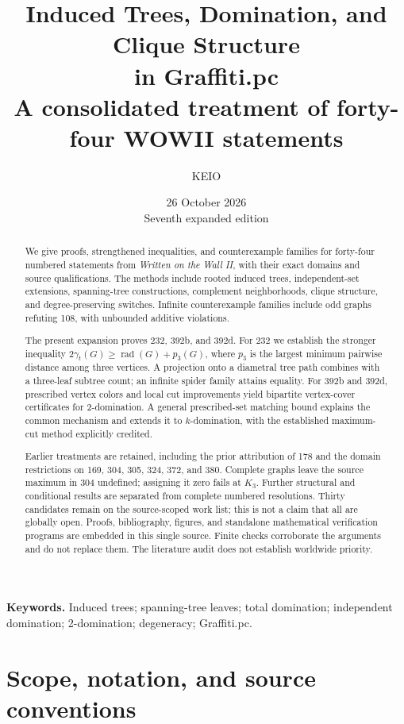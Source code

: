 \documentclass[11pt,a4paper]{article}
\title{\bfseries Induced Trees, Domination, and Clique Structure\protect\\
in Graffiti.pc\protect\\[6pt]
\large A consolidated treatment of forty-four WOWII statements}
\author{KEIO}
\date{26 October 2026\protect\\[3pt]\small Seventh expanded edition}
\theoremstyle{remark}
\begin{document}
\maketitle
\begin{abstract}
We give proofs, strengthened inequalities, and counterexample families for
forty-four numbered statements from \emph{Written on the Wall II}, with
their exact domains and source qualifications. The methods include rooted
induced trees, independent-set extensions, spanning-tree constructions,
complement neighborhoods, clique structure, and degree-preserving switches.
Infinite counterexample families include odd graphs refuting 108, with
unbounded additive violations.

The present expansion proves 232, 392b, and 392d. For 232 we establish
the stronger inequality $2\gamma_t(G)\ge\operatorname{rad}(G)+p_3(G)$,
where $p_3$ is the largest minimum pairwise distance among three vertices.
A projection onto a diametral tree path combines with a three-leaf subtree
count; an infinite spider family attains equality. For 392b and 392d,
prescribed vertex colors and local cut improvements yield bipartite
vertex-cover certificates for 2-domination. A general prescribed-set
matching bound explains the common mechanism and extends it to
$k$-domination, with the established maximum-cut method explicitly credited.

Earlier treatments are retained, including the prior attribution of 178
and the domain restrictions on 169, 304, 305, 324, 372, and 380. Complete
graphs leave the source maximum in 304 undefined; assigning it zero fails
at $K_3$. Further structural and conditional results are separated from
complete numbered resolutions. Thirty candidates remain on the
source-scoped work list; this is not a claim that all are globally open.
Proofs, bibliography, figures, and standalone mathematical verification
programs are embedded in this single source. Finite checks corroborate
the arguments and do not replace them. The literature audit does not
establish worldwide priority.
\end{abstract}
\noindent\textbf{Keywords.} Induced trees; spanning-tree leaves; total domination;
independent domination; 2-domination; degeneracy; Graffiti.pc.
\clearpage
\begingroup\small\linespread{0.96}\selectfont\tableofcontents\endgroup
\clearpage
\section{Scope, notation, and source conventions}
\end{document}
